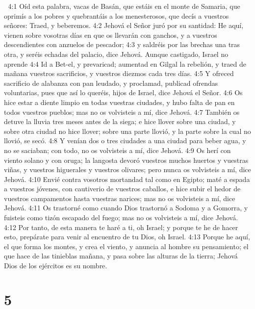 
4:1 Oíd esta palabra, vacas de Basán, que estáis en el monte de Samaria, que oprimís a los pobres y quebrantáis a los menesterosos, que decís a vuestros señores: Traed, y beberemos.  
4:2 Jehová el Señor juró por su santidad: He aquí, vienen sobre vosotras días en que os llevarán con ganchos, y a vuestros descendientes con anzuelos de pescador;  
4:3 y saldréis por las brechas una tras otra, y seréis echadas del palacio, dice Jehová.  
Aunque castigado, Israel no aprende  
4:4 Id a Bet-el, y prevaricad; aumentad en Gilgal la rebelión, y traed de mañana vuestros sacrificios, y vuestros diezmos cada tres días.  
4:5 Y ofreced sacrificio de alabanza con pan leudado, y proclamad, publicad ofrendas voluntarias, pues que así lo queréis, hijos de Israel, dice Jehová el Señor.  
4:6 Os hice estar a diente limpio en todas vuestras ciudades, y hubo falta de pan en todos vuestros pueblos; mas no os volvisteis a mí, dice Jehová.  
4:7 También os detuve la lluvia tres meses antes de la siega; e hice llover sobre una ciudad, y sobre otra ciudad no hice llover; sobre una parte llovió, y la parte sobre la cual no llovió, se secó.  
4:8 Y venían dos o tres ciudades a una ciudad para beber agua, y no se saciaban; con todo, no os volvisteis a mí, dice Jehová.  
4:9 Os herí con viento solano y con oruga; la langosta devoró vuestros muchos huertos y vuestras viñas, y vuestros higuerales y vuestros olivares; pero nunca os volvisteis a mí, dice Jehová.  
4:10 Envié contra vosotros mortandad tal como en Egipto; maté a espada a vuestros jóvenes, con cautiverio de vuestros caballos, e hice subir el hedor de vuestros campamentos hasta vuestras narices; mas no os volvisteis a mí, dice Jehová.  
4:11 Os trastorné como cuando Dios trastornó a Sodoma y a Gomorra, y fuisteis como tizón escapado del fuego; mas no os volvisteis a mí, dice Jehová.  
4:12 Por tanto, de esta manera te haré a ti, oh Israel; y porque te he de hacer esto, prepárate para venir al encuentro de tu Dios, oh Israel.  
4:13 Porque he aquí, el que forma los montes, y crea el viento, y anuncia al hombre su pensamiento; el que hace de las tinieblas mañana, y pasa sobre las alturas de la tierra; Jehová Dios de los ejércitos es su nombre.  

\chapter{5}

